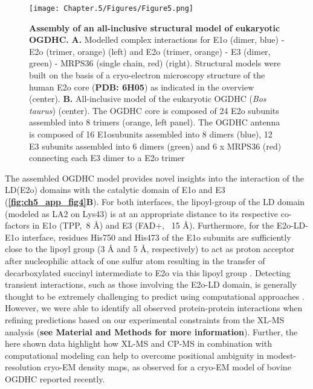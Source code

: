 \begin{figure}[p]
    \centering
    \texttt{[image: Chapter.5/Figures/Figure5.png]}
    \caption{\textbf{Assembly of an all-inclusive structural model of eukaryotic OGDHC.} \textbf{A.} Modelled complex interactions for E1o (dimer, blue) - E2o (trimer, orange) (left) and E2o (trimer, orange) - E3 (dimer, green) - MRPS36 (single chain, red) (right). Structural models were built on the basis of a cryo-electron microscopy structure of the human E2o core \cite{Nagy_2021} (\textbf{PDB: 6H05}) as indicated in the overview (center). \textbf{B.}  All-inclusive model of the eukaryotic OGDHC (\emph{Bos taurus}) (center). The OGDHC core is composed of 24 E2o subunits assembled into 8 trimers (orange, left panel). The OGDHC antenna is composed of 16 E1osubunits assembled into 8 dimers (blue), 12 E3 subunits assembled into 6 dimers (green) and 6 x MRPS36 (red) connecting each E3 dimer to a E2o trimer}
    \label{fig:ch5_fig5}
\end{figure}
The assembled OGDHC model provides novel insights into the interaction of the LD(E2o) domains with the catalytic domain of E1o and E3 (\textbf{\autoref{fig:ch5_app_fig4}B}). For both interfaces, the lipoyl-group of the LD domain (modeled as LA2 on Lys43) is at an appropriate distance to its respective co-factors in E1o (TPP,~8 Å) and E3 (FAD+, ~15 Å). Furthermore, for the E2o-LD-E1o interface, residues His750 and His473 of the E1o subunits are sufficiently close to the lipoyl group (3 Å and 5 Å, respectively) to act as proton acceptor after nucleophilic attack of one sulfur atom resulting in the transfer of decarboxylated succinyl intermediate to E2o via this lipoyl group \cite{Nemeria_2021, Pan_1998}. Detecting transient interactions, such as those involving the E2o-LD domain, is generally thought to be extremely challenging to predict using computational approaches \cite{Perrakis_2021}. However, we were able to identify all observed protein-protein interactions when refining predictions based on our experimental constraints from the XL-MS analysis (\textbf{see Material and Methods for more information}). Further, the here shown data highlight how XL-MS and CP-MS in combination with computational modeling can help to overcome positional ambiguity in modest-resolution cryo-EM density maps, as observed for a cryo-EM model of bovine OGDHC reported recently\cite{Liu_2022}.
%
